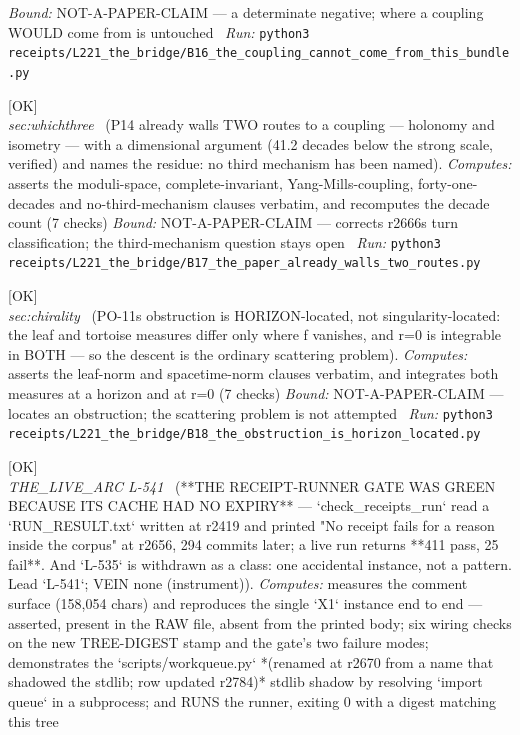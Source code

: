 \begin{description}
 \emph{Bound:} NOT-A-PAPER-CLAIM --- a determinate negative; where a coupling WOULD come from is untouched
\ \emph{Run:} \texttt{python3 receipts/L221\_the\_bridge/B16\_the\_coupling\_cannot\_come\_from\_this\_bundle.py}
\item[\label{rcpt:B17_the_paper_already_walls_two_routes}\texttt{B17\_the\_paper\_already\_walls\_two\_routes}]\hfill\textsf{[OK]}\\
\textit{sec:whichthree} \ (P14 already walls TWO routes to a coupling --- holonomy and isometry --- with a dimensional argument (41.2 decades below the strong scale, verified) and names the residue: no third mechanism has been named). 
\emph{Computes:} asserts the moduli-space, complete-invariant, Yang-Mills-coupling, forty-one-decades and no-third-mechanism clauses verbatim, and recomputes the decade count (7 checks)
 \emph{Bound:} NOT-A-PAPER-CLAIM --- corrects r2666s turn classification; the third-mechanism question stays open
\ \emph{Run:} \texttt{python3 receipts/L221\_the\_bridge/B17\_the\_paper\_already\_walls\_two\_routes.py}
\item[\label{rcpt:B18_the_obstruction_is_horizon_located}\texttt{B18\_the\_obstruction\_is\_horizon\_located}]\hfill\textsf{[OK]}\\
\textit{sec:chirality} \ (PO-11s obstruction is HORIZON-located, not singularity-located: the leaf and tortoise measures differ only where f vanishes, and r=0 is integrable in BOTH --- so the descent is the ordinary scattering problem). 
\emph{Computes:} asserts the leaf-norm and spacetime-norm clauses verbatim, and integrates both measures at a horizon and at r=0 (7 checks)
 \emph{Bound:} NOT-A-PAPER-CLAIM --- locates an obstruction; the scattering problem is not attempted
\ \emph{Run:} \texttt{python3 receipts/L221\_the\_bridge/B18\_the\_obstruction\_is\_horizon\_located.py}
\item[\label{rcpt:G50_the_receipt_runner_gate_was_green_because_its_cache_had_no_expiry}\texttt{G50\_the\_receipt\_runner\_gate\_was\_green\_because\_its\_cache\_had\_no\_expiry}]\hfill\textsf{[OK]}\\
\textit{THE\_LIVE\_ARC L-541} \ (**THE RECEIPT-RUNNER GATE WAS GREEN BECAUSE ITS CACHE HAD NO EXPIRY** --- `check\_receipts\_run` read a `RUN\_RESULT.txt` written at r2419 and printed "No receipt fails for a reason inside the corpus" at r2656, 294 commits later; a live run returns **411 pass, 25 fail**. And `L-535` is withdrawn as a class: one accidental instance, not a pattern. Lead `L-541`; VEIN none (instrument)). 
\emph{Computes:} measures the comment surface (158,054 chars) and reproduces the single `X1` instance end to end --- asserted, present in the RAW file, absent from the printed body; six wiring checks on the new TREE-DIGEST stamp and the gate's two failure modes; demonstrates the `scripts/workqueue.py` *(renamed at r2670 from a name that shadowed the stdlib; row updated r2784)* stdlib shadow by resolving `import queue` in a subprocess; and RUNS the runner, exiting 0 with a digest matching this tree

\end{description}
